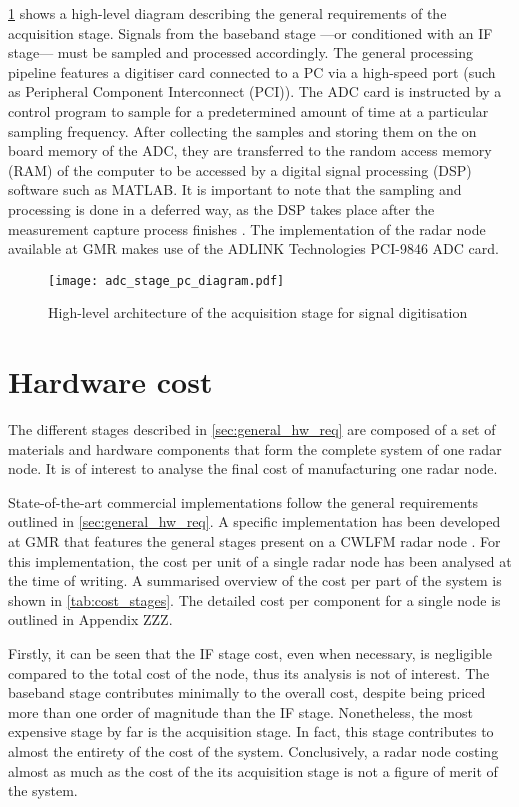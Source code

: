 \cref{fig:adc_general} shows a high-level diagram describing the general requirements of the acquisition stage. Signals from the baseband stage ---or conditioned with an IF stage--- must be sampled and processed accordingly. The general processing pipeline features a digitiser card connected to a PC via a high-speed port (such as Peripheral Component Interconnect (PCI)). The ADC card is instructed by a control program to sample for a predetermined amount of time at a particular sampling frequency. After collecting the samples and storing them on the on board memory of the ADC, they are transferred to the random access memory (RAM) of the computer to be accessed by a digital signal processing (DSP) software such as MATLAB. It is important to note that the sampling and processing is done in a deferred way, as the DSP takes place after the measurement capture process finishes \cite[p.~43-44]{ADLINKTechnologies2010}. The implementation of the radar node available at GMR makes use of the ADLINK Technologies PCI-9846 ADC card.

\begin{figure}[ht]
	\centering
	\texttt{[image: adc\_stage\_pc\_diagram.pdf]}
	\caption{High-level architecture of the acquisition stage for signal digitisation \label{fig:adc_general}}
\end{figure}


\section{Hardware cost}

The different stages described in \cref{sec:general_hw_req} are composed of a set of materials and hardware components that form the complete system of one radar node. It is of interest to analyse the final cost of manufacturing one radar node.

State-of-the-art commercial implementations follow the general requirements outlined in \cref{sec:general_hw_req}. A specific implementation has been developed at GMR that features the general stages present on a CWLFM radar node \cite{Sardinero2022}. For this implementation, the cost per unit of a single radar node has been analysed at the time of writing. A summarised overview of the cost per part of the system is shown in \cref{tab:cost_stages}. The detailed cost per component for a single node is outlined in Appendix ZZZ.

Firstly, it can be seen that the IF stage cost, even when necessary, is negligible compared to the total cost of the node, thus its analysis is not of interest. The baseband stage contributes minimally to the overall cost, despite being priced more than one order of magnitude than the IF stage. Nonetheless, the most expensive stage by far is the acquisition stage. In fact, this stage contributes to almost the entirety of the cost of the system. Conclusively, a radar node costing almost as much as the cost of the its acquisition stage is not a figure of merit of the system.

